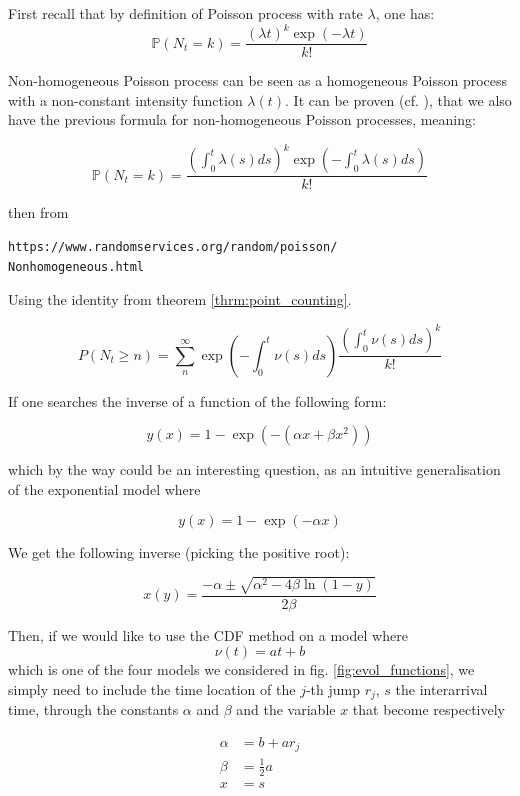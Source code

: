 \documentclass[11pt]{book}
\begin{document}

\begin{demo}{}{}
First recall that by definition of Poisson process with rate $\lambda$, one has:
$$
\mathbb P(N_t = k) = \frac { (\lambda t)^k \exp(- \lambda t ) }{k !}$$

Non-homogeneous Poisson process can be seen as a homogeneous Poisson process with a non-constant intensity function $\lambda (t)$. It can be proven (cf. \cite{Veraart}), that we also have the previous formula for non-homogeneous Poisson processes, meaning:

$$
\mathbb P(N_t = k) = \frac { \left ( \int_0^t \lambda(s) ds \right )^k \exp \left ( - \int_0^t \lambda(s) ds \right )  }{k !}$$

then from \begin{verbatim}
https://www.randomservices.org/random/poisson/
Nonhomogeneous.html
\end{verbatim}

Using the identity from theorem \ref{thrm:point_counting}.

$$ P( N_t \geq n ) = \sum_n^{\infty} \exp \left ( - \int_0^t \nu(s) ds \right ) \frac{ \left ( \int_0^t \nu(s) ds \right ) ^k }{k !} 
$$
\end{demo}


\begin{ajoutationV}{}{}
If one searches the inverse of a function of the following form:

$$ y(x) = 1 - \exp ( - (\alpha x + \beta x^2) ) $$

which by the way could be an interesting question, as an intuitive generalisation of the exponential model where 

$$ y(x) = 1 - \exp ( -\alpha x ) $$

We get the following inverse (picking the positive root):

$$ x(y) = \frac{- \alpha \pm \sqrt{\alpha^2 - 4 \beta \ln(1-y) }  }{2 \beta}$$

Then, if we would like to use the CDF method on a model where $$ \nu(t) =  a t + b $$ 
which is one of the four models we considered in fig. \ref{fig:evol_functions}, we simply need to include the time location of the $j$-th jump $r_j$, $s$ the interarrival time, through the constants $\alpha$ and $\beta$ and the variable $x$ that become respectively 

\begin{align*}
\alpha &= b + a r_j  \\
\beta &= \frac 1 2 a \\
x &= s
\end{align*}


\end{ajoutationV}
\end{document}
